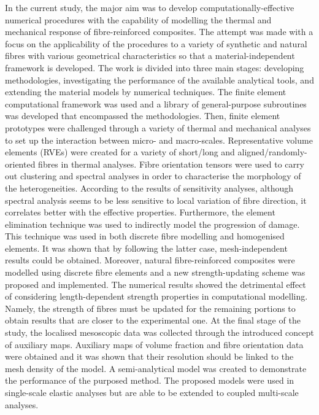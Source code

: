 
	In the current study, the major aim was to develop computationally-effective numerical procedures with the capability of modelling the thermal and mechanical response of fibre-reinforced composites. The attempt was made with a focus on the applicability of the procedures to a variety of synthetic and natural fibres with various geometrical characteristics so that a material-independent framework is developed. The work is divided into three main stages: developing methodologies, investigating the performance of the available analytical tools, and extending the material models by numerical techniques. The finite element computational framework was used and a library of general-purpose subroutines was developed that encompassed the methodologies. Then, finite element prototypes were challenged through a variety of thermal and mechanical analyses to set up the interaction between micro- and macro-scales. Representative volume elements (RVEs) were created for a variety of short/long and aligned/randomly-oriented fibres in thermal analyses. Fibre orientation tensors were used to carry out clustering and spectral analyses in order to characterise the morphology of the heterogeneities. According to the results of sensitivity analyses, although spectral analysis seems to be less sensitive to local variation of fibre direction, it correlates better with the effective properties. Furthermore, the element elimination technique was used to indirectly model the progression of damage. This technique was used in both discrete fibre modelling and homogenised elements. It was shown that by following the latter case, mesh-independent results could be obtained. Moreover, natural fibre-reinforced composites were modelled using discrete fibre elements and a new strength-updating scheme was proposed and implemented. The numerical results showed the detrimental effect of considering length-dependent strength properties in computational modelling. Namely, the strength of fibres must be updated for the remaining portions to obtain results that are closer to the experimental one. At the final stage of the study, the localised mesoscopic data was collected through the introduced concept of auxiliary maps. Auxiliary maps of volume fraction and fibre orientation data were obtained and it was shown that their resolution should be linked to the mesh density of the model. A semi-analytical model was created to demonstrate the performance of the purposed method. The proposed models were used in single-scale elastic analyses but are able to be extended to coupled multi-scale analyses. 
	
